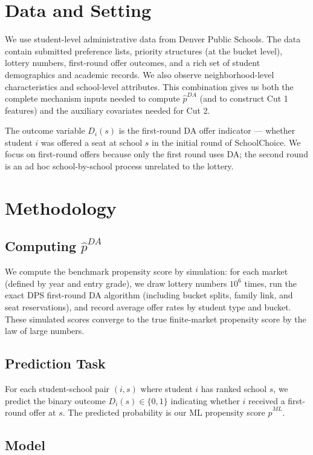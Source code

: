 \documentclass[12pt,a4paper,dvipsnames]{article}
\begin{document}
\section{Data and Setting}

We use student-level administrative data from Denver Public Schools. The data contain submitted preference lists, priority structures (at the bucket level), lottery numbers, first-round offer outcomes, and a rich set of student demographics and academic records. We also observe neighborhood-level characteristics and school-level attributes. This combination gives us both the complete mechanism inputs needed to compute $\hat{p}^{DA}$ (and to construct Cut 1 features) and the auxiliary covariates needed for Cut 2.

The outcome variable $D_i(s)$ is the first-round DA offer indicator --- whether student $i$ was offered a seat at school $s$ in the initial round of SchoolChoice. We focus on first-round offers because only the first round uses DA; the second round is an ad hoc school-by-school process unrelated to the lottery.

\section{Methodology}

\subsection{Computing $\hat{p}^{DA}$}

We compute the benchmark propensity score by simulation: for each market (defined by year and entry grade), we draw lottery numbers $10^6$ times, run the exact DPS first-round DA algorithm (including bucket splits, family link, and seat reservations), and record average offer rates by student type and bucket. These simulated scores converge to the true finite-market propensity score by the law of large numbers.

\subsection{Prediction Task}

For each student-school pair $(i, s)$ where student $i$ has ranked school $s$, we predict the binary outcome $D_i(s) \in \{0, 1\}$ indicating whether $i$ received a first-round offer at $s$. The predicted probability is our ML propensity score $\hat{p}^{ML}$.

\subsection{Model}
\end{document}

